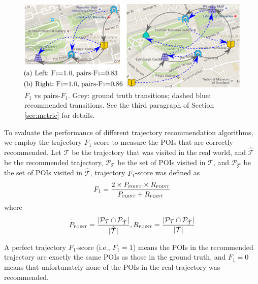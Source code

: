 \begin{figure}[t]
	\centering
	\includegraphics[width=\columnwidth]{fig/pairF1.pdf}
	\caption{$F_1$ vs pairs-$F_1$. Grey: ground truth transitions; dashed blue: recommended transitions. 
    See the third paragraph of Section \ref{sec:metric} for details.}
	\label{fig:pairf1}
\end{figure}



To evaluate the performance of different trajectory recommendation algorithms,
we employ the trajectory $F_1$-score\cite{ijcai15} to measure the POIs that are
correctly recommended. Let $\mathcal{T}$ be the trajectory that was visited in the real world,
and $\hat{\mathcal{T}}$ be the recommended trajectory,
$\mathcal{P}_{\mathcal{T}}$ be the set of POIs visited in $\mathcal{T}$,
and $\mathcal{P}_{\hat{\mathcal{T}}}$ be the set of POIs visited in $\hat{\mathcal{T}}$,
trajectory $F_1$-score was defined as
\begin{displaymath}
F_1= \frac{2 \times P_{\textsc{point}} \times R_{\textsc{point}}}
          {P_{\textsc{point}} + R_{\textsc{point}}}
\end{displaymath}
where
\begin{displaymath}
P_{\textsc{point}} = \frac{|\mathcal{P}_{\mathcal{T}} \cap \mathcal{P}_{\hat{\mathcal{T}}}|}
                          {|\hat{\mathcal{T}}|},
R_{\textsc{point}} = \frac{|\mathcal{P}_{\mathcal{T}} \cap \mathcal{P}_{\hat{\mathcal{T}}}|}
                          {|\mathcal{T}|}
\end{displaymath}

A perfect trajectory $F_1$-score (i.e., $F_1 = 1$) means the POIs in
the recommended trajectory are exactly the same POIs as those in the ground truth,
and $F_1 = 0$ means that unfortunately none of the POIs in the
real trajectory was recommended.

